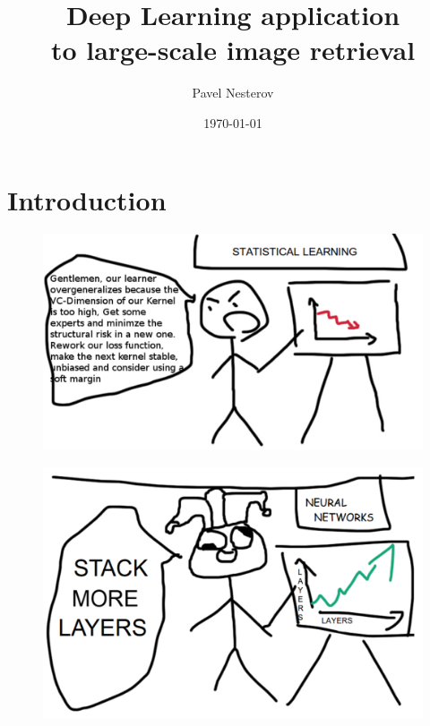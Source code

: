 \documentclass{beamer}
\title{Deep Learning application \\ to large-scale image retrieval }
\author{Pavel Nesterov}
\institute{\url{http://pavelnesterov.info/}}
\date{\today}
\let\otp\titlepage
\renewcommand{\titlepage}{\otp\addtocounter{framenumber}{-1}}
\begin{document}
\begin{frame}[plain]
  \titlepage
\end{frame}



\section{Introduction}


\begin{frame}

\begin{figure}[h!]
  \centering
  \includegraphics[width=1\textwidth]{images/stat.png}
\end{figure}

\end{frame}


\begin{frame}

\begin{figure}[h!]
  \centering
  \includegraphics[width=1\textwidth]{images/nn.png}
\end{figure}

\end{frame}
\end{document}
